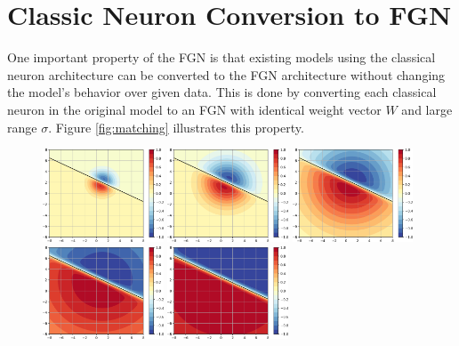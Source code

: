 \documentclass[12pt,oneside]{CUNY_PhD}
\begin{document}
\section{Classic Neuron Conversion to FGN}
One important property of the FGN is that existing models using the classical neuron architecture can be converted to the FGN architecture without changing the model's behavior over given data. This is done by converting each classical neuron in the original model to an FGN with identical weight vector $W$ and large range $\sigma$. Figure \ref{fig:matching} illustrates this property.
\begin{figure}[!htbp]
    \centering
    \includegraphics[width=0.32\textwidth]{images/Matching-behavior/sigma-2-cropped.png}
    \includegraphics[width=0.32\textwidth]{images/Matching-behavior/sigma-3-cropped.png}
    \includegraphics[width=0.32\textwidth]{images/Matching-behavior/sigma-4-cropped.png}
    \includegraphics[width=0.32\textwidth]{images/Matching-behavior/sigma-5-cropped.png}
    \includegraphics[width=0.32\textwidth]{images/Matching-behavior/sigma-6-cropped.png}

\end{figure}
\end{document}
